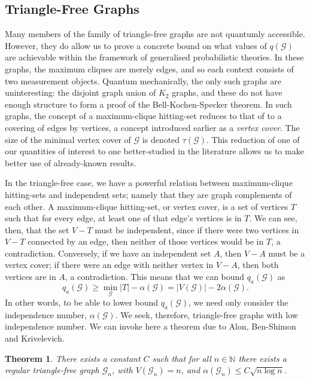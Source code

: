 \documentclass{amsart}
\newtheorem{thm}{Theorem}
\theoremstyle{definition}
\begin{document}
\subsection{Triangle-Free Graphs}

Many members of the family of triangle-free graphs are not quantumly accessible. However, they do allow us to prove a concrete bound on what values of $q(\mathcal{G})$ are achievable within the framework of generalised probabilistic theories. In these graphs, the maximum cliques are merely edges, and so each context consists of two measurement objects. Quantum mechanically, the only such graphs are uninteresting: the disjoint graph union of $K_2$ graphs, and these do not have enough structure to form a proof of the Bell-Kochen-Specker theorem. In such graphs, the concept of a maximum-clique hitting-set reduces to that of to a covering of edges by vertices, a concept introduced earlier as a \emph{vertex cover}. The size of the minimal vertex cover of $\mathcal{G}$ is denoted $\tau(\mathcal{G})$. This reduction of one of our quantities of interest to one better-studied in the literature allows us to make better use of already-known results.

In the triangle-free case, we have a powerful relation between maximum-clique hitting-sets and independent sets; namely that they are graph complements of each other. A maximum-clique hitting-set, or vertex cover, is a set of vertices $T$ such that for every edge, at least one of that edge's vertices is in $T$. We can see, then, that the set $V-T$ must be independent, since if there were two vertices in $V-T$ connected by an edge, then neither of those vertices would be in $T$, a contradiction. Conversely, if we have an independent set $A$, then $V-A$ must be a vertex cover; if there were an edge with neither vertex in $V-A$, then both vertices are in $A$, a contradiction. This means that we can bound $q_a(\mathcal{G})$ as
\begin{equation}
q_a(\mathcal{G})\geq \min_\mathcal{G} |T| - \alpha(\mathcal{G}) = |V(\mathcal{G})|-2\alpha(\mathcal{G}).
\end{equation}
In other words, to be able to lower bound $q_a(\mathcal{G})$, we need only consider the independence number, $\alpha(\mathcal{G})$. We seek, therefore, triangle-free graphs with low independence number. We can invoke here a theorem due to Alon, Ben-Shimon and Krivelevich.\cite{Alon2010}
\begin{thm}
There exists a constant $C$ such that for all $n\in\mathbb{N}$ there exists a regular triangle-free graph $\mathcal{G}_n$, with $V(\mathcal{G}_n)=n$, and $\alpha(\mathcal{G}_n)\leq C\sqrt{n\log n}$.
\end{thm}
\end{document}
